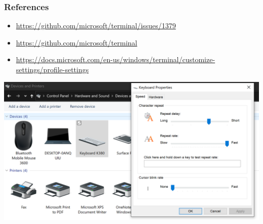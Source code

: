 \documentclass[11pt]{article}
\begin{document}
\subsubsection{References}
\label{sec:org53dd931}
\begin{itemize}
\item \url{https://github.com/microsoft/terminal/issues/1379}
\item \url{https://github.com/microsoft/terminal}
\item \url{https://docs.microsoft.com/en-us/windows/terminal/customize-settings/profile-settings}
\end{itemize}
\begin{center}
\includegraphics[width=.9\linewidth]{windows-setup/UnblinkCursor.PNG}
\end{center}
\end{document}
